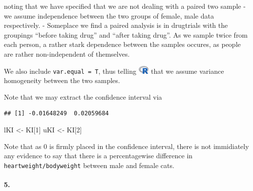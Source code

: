 \documentclass[
]{article}
\newenvironment{Shaded}{\begin{snugshade}}{\end{snugshade}}
\newcommand{\DataTypeTok}[1]{\textcolor[rgb]{0.13,0.29,0.53}{#1}}
\newcommand{\DecValTok}[1]{\textcolor[rgb]{0.00,0.00,0.81}{#1}}
\newcommand{\KeywordTok}[1]{\textcolor[rgb]{0.13,0.29,0.53}{\textbf{#1}}}
\newcommand{\NormalTok}[1]{#1}
\newcommand{\OperatorTok}[1]{\textcolor[rgb]{0.81,0.36,0.00}{\textbf{#1}}}
\newcommand{\StringTok}[1]{\textcolor[rgb]{0.31,0.60,0.02}{#1}}
\begin{document}
noting that we have specified that we are not dealing with a paired two
sample - we assume independence between the two groups of female, male
data respectively. - Someplace we find a paired analysis is in
drugtrials with the groupings ``before taking drug'' and ``after taking
drug''. As we sample twice from each person, a rather stark dependence
between the samples occures, as people are rather non-independent of
themselves.

We also include \texttt{var.equal\ =\ T}, thus telling
\includegraphics[width=\textwidth,height=0.16667in]{R_logo.png} that we
assume variance homogeneity between the two samples.

Note that we may extract the confidence interval via

\begin{Shaded}
\end{Shaded}

\begin{verbatim}
## [1] -0.01648249  0.02059684
\end{verbatim}

\begin{Shaded}
\begin{Highlighting}[]
\NormalTok{lKI <-}\StringTok{ }\NormalTok{KI[}\DecValTok{1}\NormalTok{]}
\NormalTok{uKI <-}\StringTok{ }\NormalTok{KI[}\DecValTok{2}\NormalTok{]}
\end{Highlighting}
\end{Shaded}

Note that as \(0\) is firmly placed in the confidence interval, there is
not immidiately any evidence to say that there is a percentagewise
difference in \texttt{heartweight/bodyweight} between male and female
cats.

\hypertarget{section-13}{%
\paragraph{\texorpdfstring{\textbf{5.}}{5.}}\label{section-13}}
\end{document}
